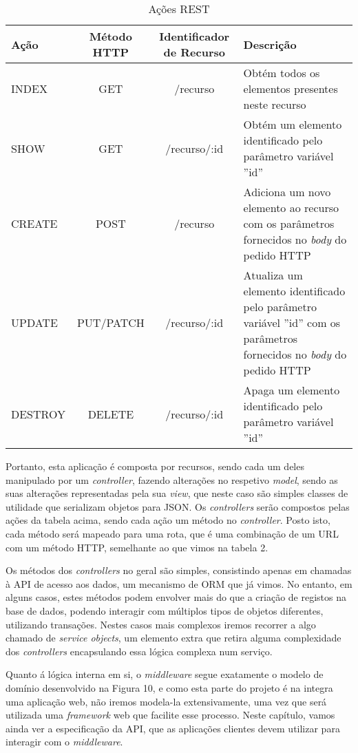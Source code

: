 \begin{table}[H]
\centering
  \begin{tabularx}{\textwidth}{ | l | c | c | X | }
    \hline
    Ação & Método HTTP & Identificador de Recurso & Descrição\\  \hline
    INDEX & GET & /recurso & Obtém todos os elementos presentes neste recurso\\ \hline
    SHOW & GET & /recurso/:id & Obtém um elemento identificado pelo parâmetro variável ''id'' \\ \hline
    CREATE & POST & /recurso & Adiciona um novo elemento ao recurso com os parâmetros fornecidos no \textit{body} do pedido HTTP\\ \hline
    UPDATE & PUT/PATCH & /recurso/:id & Atualiza um elemento identificado pelo parâmetro variável ''id'' com os parâmetros fornecidos no \textit{body} do pedido HTTP \\ \hline
    DESTROY & DELETE & /recurso/:id & Apaga um elemento identificado pelo parâmetro variável ''id'' \\ \hline
  \end{tabularx}
  \caption{Ações REST}
\end{table}

Portanto, esta aplicação é composta por recursos, sendo cada um deles manipulado por um \textit{controller}, fazendo alterações no respetivo \textit{model}, sendo as suas alterações representadas pela sua \textit{view}, que neste caso são simples classes de utilidade que serializam objetos para JSON. Os \textit{controllers} serão compostos pelas ações da tabela acima, sendo cada ação um método no \textit{controller}. Posto isto, cada método será mapeado para uma rota, que é uma combinação de um URL com um método HTTP, semelhante ao que vimos na tabela 2.

Os métodos dos \textit{controllers} no geral são simples, consistindo apenas em chamadas à API de acesso aos dados, um mecanismo de ORM que já vimos. No entanto, em alguns casos, estes métodos podem envolver mais do que a criação de registos na base de dados, podendo interagir com múltiplos tipos de objetos diferentes, utilizando transações. Nestes casos mais complexos iremos recorrer a algo chamado de \textit{service objects}, um elemento extra que retira alguma complexidade dos \textit{controllers} encapsulando essa lógica complexa num serviço.

Quanto á lógica interna em si, o \textit{middleware} segue exatamente o modelo de domínio desenvolvido na Figura 10, e como esta parte do projeto é na integra uma aplicação web, não iremos modela-la extensivamente, uma vez que será utilizada uma \textit{framework} web que facilite esse processo. Neste capítulo, vamos ainda ver a especificação da API, que as aplicações clientes devem utilizar para interagir com o \textit{middleware}.

